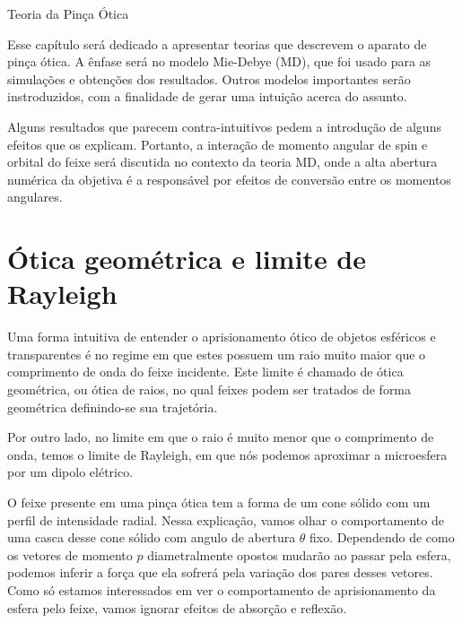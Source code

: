 \begin{chapter}{Teoria da Pinça Ótica}
\label{cap2}

\hspace{5 mm}Esse capítulo será dedicado a apresentar teorias que descrevem o aparato de pinça ótica. A ênfase será no modelo Mie-Debye (MD), que foi usado para as simulações e obtenções dos resultados. Outros modelos importantes serão instroduzidos, com a finalidade de gerar uma intuição acerca do assunto. 

Alguns resultados que parecem contra-intuitivos pedem a introdução de alguns efeitos que os explicam. Portanto, a interação de momento angular de spin e orbital do feixe será discutida no contexto da teoria MD, onde a alta abertura numérica da objetiva é a responsável por efeitos de conversão entre os momentos angulares\cite{Bliokh2015}.

\section{Ótica geométrica e limite de Rayleigh}

\hspace{5 mm}Uma forma intuitiva de entender o aprisionamento ótico de objetos esféricos e transparentes é no regime em que estes possuem um raio muito maior que o comprimento de onda do feixe incidente. Este limite é chamado de ótica geométrica, ou ótica de raios, no qual feixes podem ser tratados de forma geométrica definindo-se sua trajetória.

Por outro lado, no limite em que o raio é muito menor que o comprimento de onda, temos o limite de Rayleigh, em que nós podemos aproximar a microesfera por um dipolo elétrico.

O feixe presente em uma pinça ótica tem a forma de um cone sólido com um perfil de intensidade radial. Nessa explicação, vamos olhar o comportamento de uma casca desse cone sólido com angulo de abertura $\theta$ fixo. Dependendo de como os vetores de momento $p$ diametralmente opostos mudarão ao passar pela esfera, podemos inferir a força que ela sofrerá pela variação dos pares desses vetores. Como só estamos interessados em ver o comportamento de aprisionamento da esfera pelo feixe, vamos ignorar efeitos de absorção e reflexão. 


\end{chapter}
